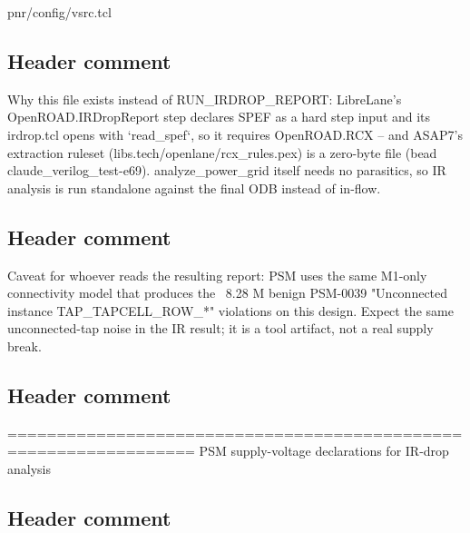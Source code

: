 \begin{relocated}{pnr/config/vsrc.tcl}

\subsection*{Header comment}

\begin{textblock}
Why this file exists instead of RUN_IRDROP_REPORT: LibreLane's
OpenROAD.IRDropReport step declares SPEF as a hard step input and its
irdrop.tcl opens with `read_spef`, so it requires OpenROAD.RCX --
and ASAP7's extraction ruleset (libs.tech/openlane/rcx_rules.pex) is a
zero-byte file (bead claude_verilog_test-e69). analyze_power_grid itself
needs no parasitics, so IR analysis is run standalone against the final
ODB instead of in-flow.
\end{textblock}

\subsection*{Header comment}

\begin{textblock}

Caveat for whoever reads the resulting report: PSM uses the same M1-only
connectivity model that produces the ~8.28 M benign PSM-0039
"Unconnected instance TAP_TAPCELL_ROW_*" violations on this design. Expect
the same unconnected-tap noise in the IR result; it is a tool artifact,
not a real supply break.
\end{textblock}

\subsection*{Header comment}

\begin{textblock}
=================================================================
PSM supply-voltage declarations for IR-drop analysis
\end{textblock}

\subsection*{Header comment}


\end{relocated}

